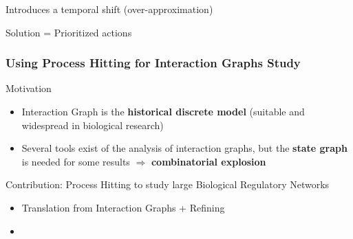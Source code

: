 \begin{frame}
\begin{center}
{
}
\end{center}

\pause[8]
\begin{fleches}
\item Introduces a temporal shift (over-approximation)
\pause[9]
\item Solution = Prioritized actions
\end{fleches}

\end{frame}


\begin{frame}
  \frametitle{Using Process Hitting for Interaction Graphs Study}

\begin{block}{Motivation}
\begin{itemize}
  \item Interaction Graph is the \textbf{historical discrete model} (suitable and widespread in biological research) 
  \item Several tools exist of the analysis of interaction graphs, but the \textbf{state graph} is needed for some results $\Rightarrow$ \textbf{combinatorial explosion}
\end{itemize}  
\end{block}

\begin{block}{Contribution: Process Hitting to study large Biological Regulatory Networks}
\begin{itemize}
  \item Translation from Interaction Graphs + Refining
  \item {}
\end{itemize}
\end{block}

\end{frame}

